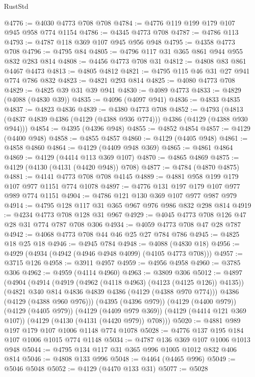 \begin{lexlean}{RustStd}
\begin{coremodule}
{\begin{coremodule}
{{{{{{{{{{{{{{@4776 := @4030 @4773 @708 @708
@4784 := @4776 @119 @199 @179 @107 @945 @958 @774 @1154
@4786 := @4345 @4773 @708
@4787 := @4786 @113
@4793 := @4787 @118 @369 @107 @945 @956 @948
@4795 := @4358 @4773 @708
@4796 := @4795 @84
@4805 := @4796 @117 @31 @365 @861 @944 @955 @832 @283 @814
@4808 := @4456 @4773 @708 @31
@4812 := @4808 @83 @861 @4467 @4473
@4813 := @4805 @4812
@4821 := @4795 @115 @46 @31 @27 @941 @774 @786 @832
@4823 := @4821 @293 @814
@4825 := @4080 @4773 @708
@4829 := @4825 @39 @31 @39 @941
@4830 := @4089 @4773
@4833 := @4829 (@4088 (@4830 @39))
@4835 := @4096 (@4097 @941)
@4836 := @4833 @4835
@4837 := @4823 @4836
@4839 := @4380 @4773 @708
@4852 := @4793 (@4813 (@4837 @4839 @4386 (@4129 (@4388 @936 @774))) @4386 (@4129 (@4388 @930 @944)))
@4854 := @4395 (@4396 @948)
@4855 := @4852 @4854
@4857 := @4129 (@4400 @948)
@4858 := @4855 @4857
@4860 := @4129 (@4405 @948)
@4861 := @4858 @4860
@4864 := @4129 (@4409 @948 @369)
@4865 := @4861 @4864
@4869 := @4129 (@4414 @113 @369 @107)
@4870 := @4865 @4869
@4875 := @4129 (@4130 (@4131 (@4420 @948)) @708)
@4877 := @4784 (@4870 @4875)
@4881 := @4141 @4773 @708 @708 @4145
@4889 := @4881 @958 @199 @179 @107 @977 @1151 @774 @1078
@4897 := @4776 @131 @197 @179 @107 @977 @989 @774 @1151
@4904 := @4786 @121 @130 @369 @107 @977 @987 @979
@4914 := @4795 @128 @117 @31 @365 @967 @976 @986 @832 @298 @814
@4919 := @4234 @4773 @708 @128 @31 @967
@4929 := @4045 @4773 @708 @126 @47 @28 @31 @774 @787 @708 @306
@4934 := @4059 @4773 @708 @47 @28 @787
@4942 := @4068 @4773 @708 @44 @46 @25 @27 @784 @786
@4945 := @4825 @18 @25 @18
@4946 := @4945 @784
@4948 := @4088 (@4830 @18)
@4956 := @4929 (@4934 (@4942 (@4946 @4948 @4099) (@4105 @4773 @708)))
@4957 := @3715 @126
@4958 := @3911 @4957
@4959 := @4956 @4958
@4960 := @3785 @306
@4962 := @4959 (@4114 @4960)
@4963 := @3809 @306
@5012 := @4897
    (@4904
      (@4914
        (@4919 (@4962 (@4118 @4963) (@4123 (@4125 @126)) @4135))
        (@4821 @340 @814 @4836 @4839 @4386 (@4129 (@4388 @970 @774)))
        @4386
        (@4129 (@4388 @960 @976)))
      (@4395 (@4396 @979))
      (@4129 (@4400 @979))
      (@4129 (@4405 @979))
      (@4129 (@4409 @979 @369))
      (@4129 (@4414 @121 @369 @107))
      (@4129 (@4130 (@4131 (@4420 @979)) @708)))
@5020 := @4881 @989 @197 @179 @107 @1006 @1148 @774 @1078
@5028 := @4776 @137 @195 @184 @107 @1006 @1015 @774 @1148
@5034 := @4787 @136 @369 @107 @1006 @1013 @948
@5044 := @4795 @134 @117 @31 @365 @996 @1005 @1012 @832 @406 @814
@5046 := @4808 @133 @996
@5048 := @4464 (@4465 @996)
@5049 := @5046 @5048
@5052 := @4129 (@4470 @133 @31)
@5077 := @5028
}}}}}}}}}}}}}}
\end{coremodule}}
\end{coremodule}
\end{lexlean}
